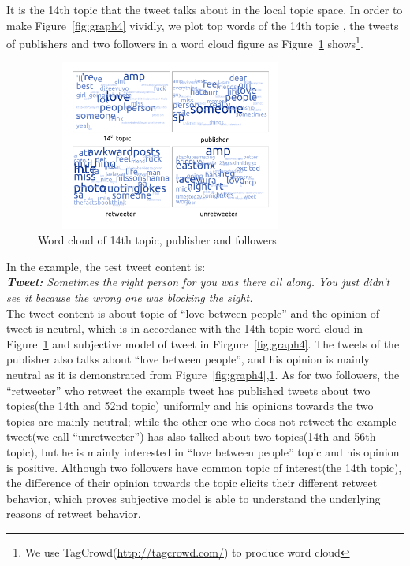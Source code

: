 \documentclass{acm_proc_article-sp}
\begin{document}
It is the 14th topic that the tweet talks about in the local topic space.
In order to make Figure~\ref{fig:graph4} vividly, we plot top words of the 14th topic , the tweets of publishers and two followers in a word cloud figure as Figure~\ref{fig:graph5} shows\footnote{We use TagCrowd(\url{http://tagcrowd.com/}) to produce word cloud}.
\begin{figure}[htb]
\centering
\includegraphics[width=3.5in,height=2.2in]{text_cloud.pdf}
\caption{Word cloud of 14th topic, publisher and followers}
\label{fig:graph5}
\end{figure}
In the example, the test tweet content is:\\
\textit{\textbf{Tweet:} Sometimes the right person for you was there all along. You just didn’t see it because the wrong one was blocking the sight.}\\
The tweet content is about topic of ``love between people'' and the opinion of tweet is neutral, which is in accordance with the 14th topic word cloud in Figure~\ref{fig:graph5} and subjective model of tweet in Firgure~\ref{fig:graph4}.
The tweets of the publisher also talks about ``love between people'', and his opinion is mainly neutral as it is demonstrated from Figure~\ref{fig:graph4},\ref{fig:graph5}.
As for two followers, the ``retweeter'' who retweet the example tweet has published tweets about two topics(the 14th and 52nd topic) uniformly and his opinions towards the two topics are mainly neutral;
while the other one who does not retweet the example tweet(we call ``unretweeter'') has also talked about two topics(14th and 56th topic), but he is mainly interested in ``love between people'' topic and his opinion is positive.
Although two followers have common topic of interest(the 14th topic), the difference of their opinion towards the topic elicits their different retweet behavior, which proves subjective model is able to understand the underlying reasons of retweet behavior.
\end{document}
